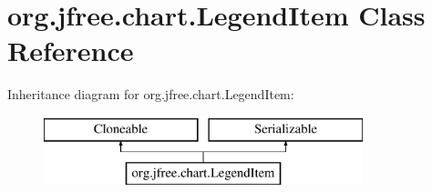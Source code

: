 \hypertarget{classorg_1_1jfree_1_1chart_1_1_legend_item}{}\section{org.\+jfree.\+chart.\+Legend\+Item Class Reference}
\label{classorg_1_1jfree_1_1chart_1_1_legend_item}
Inheritance diagram for org.\+jfree.\+chart.\+Legend\+Item\+:\begin{figure}[H]
\begin{center}
\leavevmode
\includegraphics[height=2.000000cm]{classorg_1_1jfree_1_1chart_1_1_legend_item}
\end{center}
\end{figure}
